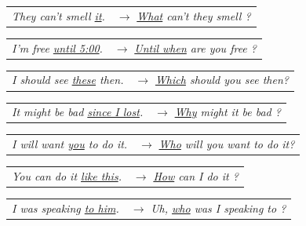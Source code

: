 \begin{exe}
    \ex
    \begin{xlist}
        \ex 
        \begin{tabular}[t]{@{}p{4.4cm}@{}p{6cm}@{}}
            \textit{They can't smell \uline{it}.} & \(\rightarrow\) \textit{\uline{What} can't they smell \uline{\phantom{it}}?}
        \end{tabular}
        
        \ex 
        \begin{tabular}[t]{@{}p{4.4cm}@{}p{6cm}@{}}
            \textit{I'm free \uline{until 5:00}.} & \(\rightarrow\) \textit{\uline{Until when} are you free \uline{\phantom{until 5:00}}?}
        \end{tabular}
        
        \ex 
        \begin{tabular}[t]{@{}p{4.4cm}@{}p{6cm}@{}}
            \textit{I should see \uline{these} then.} & \(\rightarrow\) \textit{\uline{Which} should you see \uline{\phantom{them}} then?}
        \end{tabular}
        
        \ex 
        \begin{tabular}[t]{@{}p{4.4cm}@{}p{6cm}@{}}
            \textit{It might be bad \uline{since I lost}.} & \(\rightarrow\) \textit{\uline{Why} might it be bad \uline{\phantom{since I lost}}?}
        \end{tabular}

        \ex 
        \begin{tabular}[t]{@{}p{4.4cm}@{}p{6cm}@{}}
            \textit{I will want \uline{you} to do it.} & \(\rightarrow\) \textit{\uline{Who} will you want \uline{\phantom{you}} to do it?}
        \end{tabular}

        \ex \label{ex:how-can-I}
        \begin{tabular}[t]{@{}p{4.4cm}@{}p{6cm}@{}}
            \textit{You can do it \uline{like this}.} & \(\rightarrow\) \textit{\uline{How} can I do it \uline{\phantom{like this}}?}
        \end{tabular}

        \ex \label{ex:about-what}
        \begin{tabular}[t]{@{}p{4.4cm}@{}p{6cm}@{}}
            \textit{I was speaking \uline{to him}.} & \(\rightarrow\) \textit{Uh, \uline{who} was I speaking to \uline{\phantom{him}}?}
        \end{tabular}
    \end{xlist}
    \label{ex:int-phr-inversion}
\end{exe}

